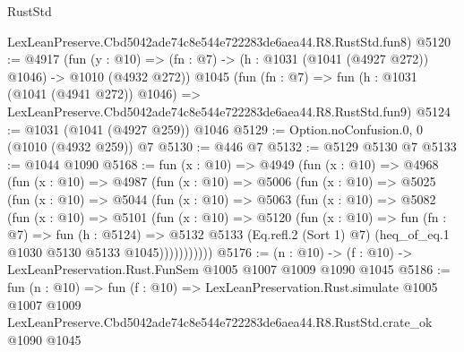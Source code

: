 \begin{lexlean}{RustStd}
\begin{coremodule}
    LexLeanPreserve.Cbd5042ade74c8e544e722283de6aea44.R8.RustStd.fun8)
@5120 := @4917
    (fun (y : @10) => (fn : @7) -> (h : @1031 (@1041 (@4927 @272)) @1046) -> @1010 (@4932 @272))
    @1045
    (fun (fn : @7) =>
    fun (h : @1031 (@1041 (@4941 @272)) @1046) =>
    LexLeanPreserve.Cbd5042ade74c8e544e722283de6aea44.R8.RustStd.fun9)
@5124 := @1031 (@1041 (@4927 @259)) @1046
@5129 := Option.noConfusion.{0, 0} (@1010 (@4932 @259)) @7
@5130 := @446 @7
@5132 := @5129 @5130 @7
@5133 := @1044 @1090
@5168 := fun (x : @10) =>
  @4949
    (fun (x : @10) =>
    @4968
      (fun (x : @10) =>
      @4987
        (fun (x : @10) =>
        @5006
          (fun (x : @10) =>
          @5025
            (fun (x : @10) =>
            @5044
              (fun (x : @10) =>
              @5063
                (fun (x : @10) =>
                @5082
                  (fun (x : @10) =>
                  @5101
                    (fun (x : @10) =>
                    @5120
                      (fun (x : @10) =>
                      fun (fn : @7) =>
                      fun (h : @5124) =>
                      @5132
                        @5133
                        (Eq.refl.{2} (Sort 1) @7)
                        (heq_of_eq.{1} @1030 @5130 @5133 @1045)))))))))))
@5176 := (n : @10) -> (f : @10) -> LexLeanPreservation.Rust.FunSem @1005 @1007 @1009 @1090 @1045
@5186 := fun (n : @10) =>
  fun (f : @10) =>
  LexLeanPreservation.Rust.simulate
    @1005
    @1007
    @1009
    LexLeanPreserve.Cbd5042ade74c8e544e722283de6aea44.R8.RustStd.crate_ok
    @1090
    @1045
\end{coremodule}
\end{lexlean}
